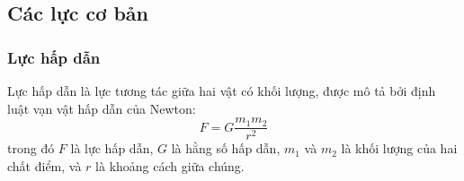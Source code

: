 \subsection{Các lực cơ bản}

\begin{frame}
    \frametitle{Lực hấp dẫn}
    \begin{tcolorbox}[colback=blue!10, colframe=blue!50!black, title=Định nghĩa]
    Lực hấp dẫn là lực tương tác giữa hai vật có khối lượng, được mô tả bởi định luật vạn vật hấp dẫn của Newton:
    \begin{equation}
        F = G \frac{m_1 m_2}{r^2}
    \end{equation}
    trong đó \(F\) là lực hấp dẫn, \(G\) là hằng số hấp dẫn, \(m_1\) và \(m_2\) là khối lượng của hai chất điểm, và \(r\) là khoảng cách giữa chúng.
    \end{tcolorbox}
\end{frame}

